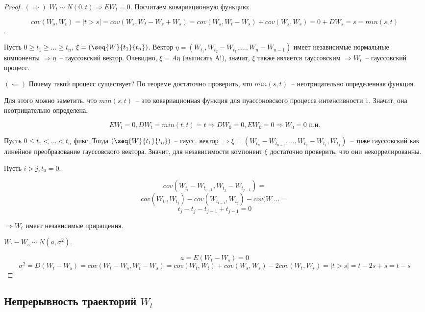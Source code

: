 \begin{proof}
$(\Rightarrow)$ $W_t \sim N(0, t) \Rightarrow EW_t = 0$. Посчитаем ковариационную функцию:

$$cov(W_s, W_t) = |t > s| = cov(W_s, W_t - W_s + W_s) = cov(W_s, W_t-W_s) + cov(W_s, W_s)
= 0 + DW_s = s = min(s, t)$$.

Пусть $0 \geq t_1 \geq \dots \geq t_n$, $\xi = (\seq{W}{t_1}{t_n})$.
Вектор $\eta = (W_{t_1}, W_{t_2} - W_{t_1}, \dots, W_n - W_{n-1})$ имеет независимые нормальные
компоненты $\Rightarrow \eta$~-- гауссовский вектор.  Очевидно, $\xi = A\eta$ (выписать A!), значит,
$\xi$ также является гауссовским $\Rightarrow W_t$~-- гауссовский процесс.

$(\Leftarrow)$ Почему такой процесс существует? По теореме достаточно проверить, что $min(s, t)$~--
неотрицательно определенная функция.

Для этого можно заметить, что $min(s,t)$~-- это ковариационная функция для пуассоновского процесса
интенсивности $1$. Значит, она неотрицательно определена.

$$EW_t = 0, DW_t = min(t, t) = t \Rightarrow DW_0 = 0, EW_0 = 0 \Rightarrow W_0 = 0 \text{ п.н.}$$

Пусть $0 \leq t_1 < \dots < t_n$ фикс. Тогда $(\seq{W}{t_1}{t_n})$~-- гаусс. вектор
$\Rightarrow \xi = (W_{t_n} - W_{t_{n-1}}, \dots, W_{t_2} - W_{t_1}, W_{t_1})$~-- тоже гауссовский
как линейное преобразование гауссовского вектора. Значит, для независимости компонент $\xi$
достаточно проверить, что они некоррелированны.

Пусть $i > j, t_0 = 0$.

$$cov(W_{t_i} - W_{t_{i-1}}, W_{t_j} - W_{t_{j-1}}) =$$
$$cov(W_{t_i}, W_{t_j}) - cov(W_{t_{i-1}}, W_{t_j}) -
cov(W_.... =$$
$$t_j - t_j - t_{j-1} + t_{j-1} = 0$$

$\Rightarrow W_t$ имеет независимые приращения.

$W_t - W_s \sim N(a, \sigma^2)$.

$$a = E(W_t-W_s) = 0$$
$$\sigma^2 = D(W_t-W_s) = cov(W_t-W_s, W_t-W_s) =
cov(W_t, W_t) + cov(W_s, W_s) - 2cov(W_t,W_s) = |t > s| = t - 2s + s = t-s$$
\end{proof}

\subsection{Непрерывность траекторий $W_t$}

